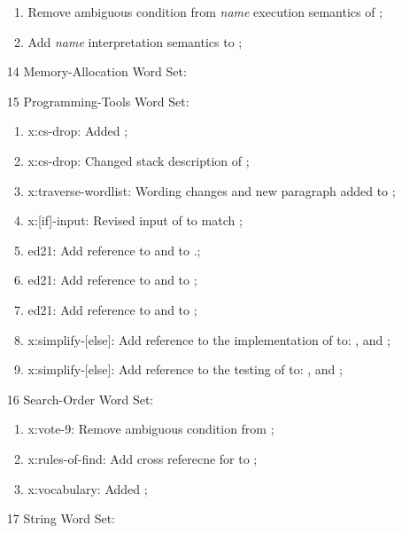 \begin{itemize}
\begin{enumerate}
		\item Remove ambiguous condition from \emph{name} execution semantics of ;
		\item Add \emph{name} interpretation semantics to ;
		\end{enumerate}
	\item[14] Memory-Allocation Word Set:	%
	\item[15] Programming-Tools Word Set:	%
		\begin{enumerate}
		\item \textsf{x:cs-drop}: Added ;
		\item \textsf{x:cs-drop}: Changed stack description of ;
		\item \textsf{x:traverse-wordlist}: Wording changes and new paragraph added
			to ;
		\item \textsf{x:[if]-input}: Revised input of  to match
			;
		\item \textsf{ed21}: Add reference to \word[tools]{[IF]} and \word[tools]{[THEN]}
			to .;
		\item \textsf{ed21}: Add reference to \word[tools]{[ELSE]} and \word[tools]{[THEN]}
			to ;
		\item \textsf{ed21}: Add reference to \word[tools]{[IF]} and \word[tools]{[ELSE]}
			to ;
		\item \textsf{x:simplify-[else]}: Add reference to the implementation of
			\word[tools]{[ELSE]} to:
			,
			 and
			;
		\item \textsf{x:simplify-[else]}: Add reference to the testing of
			\word[tools]{[THEN]} to:
			,
			 and
			;
		\end{enumerate}
	\item[16] Search-Order Word Set:		%
		\begin{enumerate}
		\item \textsf{x:vote-9}: Remove ambiguous condition from
			;
		\item \textsf{x:rules-of-find}: Add cross referecne for
			 to ;
		\item \textsf{x:vocabulary}: Added ;
		\end{enumerate}
	\item[17] String Word Set:				%

\end{itemize}
